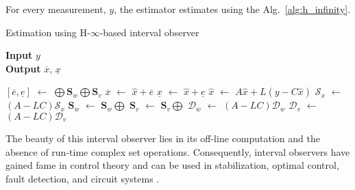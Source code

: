 For every measurement, $y$, the estimator estimates using the Alg.~\ref{alg:h_infinity}.
\begin{algorithm}
		
        \caption{Estimation using H-$\infty$-based interval observer}
        \textbf{Input} $y$\\
 		\textbf{Output} $\overline{x}$, $\underline{x}$
        \begin{algorithmic}[1]
        \State $[\overline{e}, \underline{e}]$ $\gets$ $\bigoplus \textbf{S}_w \bigoplus \textbf{S}_v$ \label{alg:main_constraints}
        \State $\overline{x}$ $\gets$ $\hat{x} + \overline{e}$
        \State $\underline{x}$ $\gets$ $\hat{x} + \underline{e}$
        \State $\hat{x}$ $\gets$ $A\hat{x} + L(y- C\hat{x})$ \label{alg:main_reac}
        \State $\mathcal{S}_x$ $\gets$ $(A-LC)\mathcal{S}_x$
        \State $\textbf{S}_w$ $\gets$ $\textbf{S}_w \bigoplus$ 
        \State $\textbf{S}_v$ $\gets$ $\textbf{S}_v \bigoplus$ 
        \State $\mathcal{D}_w$ $\gets$ $(A-LC)\mathcal{D}_w$
        \State $\mathcal{D}_v$ $\gets$ $(A-LC)\mathcal{D}_v$
        \end{algorithmic}
        \label{alg:h_infinity}
\end{algorithm}

The beauty of this interval observer lies in its off-line computation and the absence of run-time complex set operations. Consequently, interval observers have gained fame in control theory and can be used in stabilization, optimal control, fault detection, and circuit systems \cite{Huang2019}.



